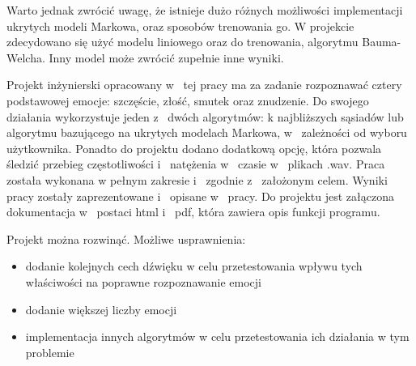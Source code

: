 \documentclass[declaration,shortabstract]{iithesis}
\begin{document}
Warto jednak zwrócić uwagę, że istnieje dużo różnych możliwości implementacji ukrytych modeli Markowa, oraz sposobów trenowania go. W projekcie zdecydowano się użyć modelu liniowego oraz do trenowania, algorytmu Bauma-Welcha. Inny model może zwrócić zupełnie inne wyniki.

Projekt inżynierski opracowany w~ tej pracy ma za zadanie rozpoznawać cztery podstawowej emocje: szczęście, złość, smutek oraz znudzenie. Do swojego działania wykorzystuje jeden z~ dwóch algorytmów: k najbliższych sąsiadów lub algorytmu bazującego na ukrytych modelach Markowa, w~ zależności od wyboru użytkownika. Ponadto do projektu dodano dodatkową opcję, która pozwala śledzić przebieg częstotliwości i~ natężenia w~ czasie w~ plikach .wav. Praca została wykonana w pełnym zakresie i~ zgodnie z~ założonym celem. Wyniki pracy zostały zaprezentowane i~ opisane w~ pracy. Do projektu jest załączona dokumentacja w~ postaci html i~ pdf, która zawiera opis funkcji programu.

Projekt można rozwinąć. Możliwe usprawnienia:
\begin{itemize}
\item dodanie kolejnych cech dźwięku w celu przetestowania wpływu tych właściwości na poprawne rozpoznawanie emocji
\item dodanie większej liczby emocji
\item implementacja innych algorytmów w celu przetestowania ich działania w tym problemie
\end{itemize}

\listoffigures
\listoftables
\nocite{*}
\printbibliography
\end{document}

